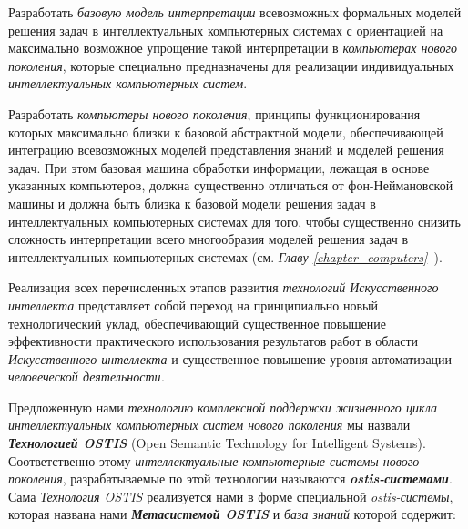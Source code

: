\begin{textitemize}
\begin{textitemize}
\begin{textitemize}
		\end{textitemize}
	\end{textitemize}
	\item 
	Разработать \textit{базовую модель интерпретации} всевозможных формальных моделей решения задач в интеллектуальных компьютерных системах с ориентацией на максимально возможное упрощение такой интерпретации в \textit{компьютерах нового поколения}, которые специально предназначены для реализации индивидуальных \textit{интеллектуальных компьютерных систем}.
	\item 
	Разработать \textit{компьютеры нового поколения}, принципы функционирования которых максимально близки к базовой абстрактной модели, обеспечивающей интеграцию всевозможных моделей представления знаний и моделей решения задач. При этом базовая машина обработки информации, лежащая в основе указанных компьютеров, должна существенно отличаться от фон-Неймановской машины и должна быть близка к базовой модели решения задач в интеллектуальных компьютерных системах для того, чтобы существенно снизить сложность интерпретации всего многообразия моделей решения задач в интеллектуальных компьютерных системах (см. \textit{Главу \ref{chapter_computers}~}).
\end{textitemize}

Реализация всех перечисленных этапов развития \textit{технологий Искусственного интеллекта} представляет собой переход на принципиально новый технологический уклад, обеспечивающий существенное повышение эффективности практического использования результатов работ в области \textit{Искусственного интеллекта} и существенное повышение уровня автоматизации \textit{человеческой деятельности.}

Предложенную нами \textit{технологию комплексной поддержки жизненного цикла интеллектуальных компьютерных систем нового поколения} мы назвали \textbf{\textit{Технологией OSTIS}} (Open Semantic Technology for Intelligent Systems). Соответственно этому \textit{интеллектуальные компьютерные системы нового поколения}, разрабатываемые по этой технологии называются \textbf{\textit{ostis-системами}}. Сама \textit{Технология OSTIS} реализуется нами в форме специальной \textit{ostis-системы}, которая названа нами \textbf{\textit{Метасистемой OSTIS}} и \textit{база знаний} которой содержит:

